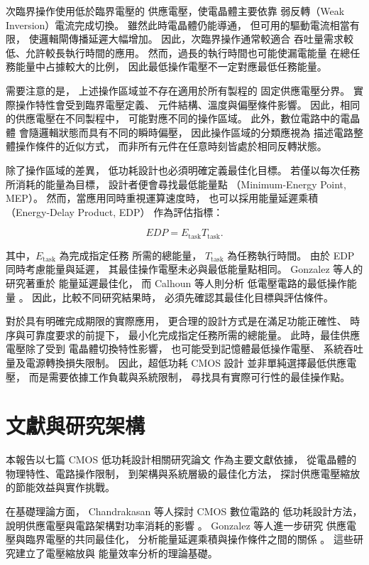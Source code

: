 次臨界操作使用低於臨界電壓的
供應電壓，使電晶體主要依靠
弱反轉（Weak Inversion）電流完成切換。
雖然此時電晶體仍能導通，
但可用的驅動電流相當有限，
使邏輯閘傳播延遲大幅增加。
因此，次臨界操作通常較適合
吞吐量需求較低、允許較長執行時間的應用。
然而，過長的執行時間也可能使漏電能量
在總任務能量中占據較大的比例，
因此最低操作電壓不一定對應最低任務能量。

需要注意的是，
上述操作區域並不存在適用於所有製程的
固定供應電壓分界。
實際操作特性會受到臨界電壓定義、
元件結構、溫度與偏壓條件影響。
因此，相同的供應電壓在不同製程中，
可能對應不同的操作區域。
此外，數位電路中的電晶體
會隨邏輯狀態而具有不同的瞬時偏壓，
因此操作區域的分類應視為
描述電路整體操作條件的近似方式，
而非所有元件在任意時刻皆處於相同反轉狀態。

除了操作區域的差異，
低功耗設計也必須明確定義最佳化目標。
若僅以每次任務所消耗的能量為目標，
設計者便會尋找最低能量點
（Minimum-Energy Point, MEP）。
然而，當應用同時重視運算速度時，
也可以採用能量延遲乘積
（Energy-Delay Product, EDP）
作為評估指標：

\begin{equation}
EDP = E_{\mathrm{task}} T_{\mathrm{task}}.
\label{eq:energy_delay_product}
\end{equation}

其中，$E_{\mathrm{task}}$ 為完成指定任務
所需的總能量，
$T_{\mathrm{task}}$ 為任務執行時間。
由於 EDP 同時考慮能量與延遲，
其最佳操作電壓未必與最低能量點相同。
Gonzalez 等人的研究著重於
能量延遲最佳化，
而 Calhoun 等人則分析
低電壓電路的最低操作能量
\cite{gonzalez1997,calhoun2005}。
因此，比較不同研究結果時，
必須先確認其最佳化目標與評估條件。

對於具有明確完成期限的實際應用，
更合理的設計方式是在滿足功能正確性、
時序與可靠度要求的前提下，
最小化完成指定任務所需的總能量。
此時，最佳供應電壓除了受到
電晶體切換特性影響，
也可能受到記憶體最低操作電壓、
系統吞吐量及電源轉換損失限制。
因此，超低功耗 CMOS 設計
並非單純選擇最低供應電壓，
而是需要依據工作負載與系統限制，
尋找具有實際可行性的最佳操作點。


\section{文獻與研究架構}
\label{sec:literature_framework}

本報告以七篇 CMOS 低功耗設計相關研究論文
作為主要文獻依據，
從電晶體的物理特性、電路操作限制，
到架構與系統層級的最佳化方法，
探討供應電壓縮放的節能效益與實作挑戰。

在基礎理論方面，
Chandrakasan 等人探討 CMOS 數位電路的
低功耗設計方法，
說明供應電壓與電路架構對功率消耗的影響
\cite{chandrakasan1992}。
Gonzalez 等人進一步研究
供應電壓與臨界電壓的共同最佳化，
分析能量延遲乘積與操作條件之間的關係
\cite{gonzalez1997}。
這些研究建立了電壓縮放與
能量效率分析的理論基礎。

